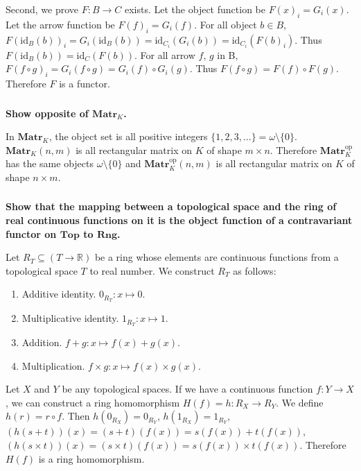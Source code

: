 \documentclass{article}
\begin{document}
Second, we prove $F : B \rightarrow C$ exists. Let the object function be $F(x)_i = G_i(x)$. Let the arrow function be $F(f)_i = G_i(f)$. For all object $b \in B$, $F(\mathrm{id}_B(b))_i = G_i(\mathrm{id}_B(b)) =  \mathrm{id}_{C_i}(G_i(b)) = \mathrm{id}_{C_i}(F(b)_i)$. Thus $F(\mathrm{id}_B(b)) = \mathrm{id}_{C}(F(b))$. For all arrow $f$, $g$ in B, $F(f \circ g)_i = G_i(f \circ g) = G_i(f) \circ G_i(g)$. Thus $F(f \circ g) = F(f) \circ F(g)$. Therefore $F$ is a functor.

\subsubsection{}

\textbf{Show opposite of $\mathbf{Matr}_K$.}

In $\mathbf{Matr}_K$, the object set is all positive integers $\{1, 2, 3, ...\} = \omega \setminus \{0\}$. $\mathbf{Matr}_K(n, m)$ is all rectangular matrix on $K$ of shape $m \times n$. Therefore $\mathbf{Matr}_K^{\mathrm{op}}$ has the same objects $\omega \setminus \{0\}$ and  $\mathbf{Matr}_K^{\mathrm{op}}(n, m)$ is all rectangular matrix on $K$ of shape $n \times m$.

\subsubsection{}

\textbf{Show that the mapping between a topological space and the ring of real continuous functions on it is the object function of a contravariant functor on $\mathbf{Top}$ to $\mathbf{Rng}$.}

Let $R_T \subseteq (T \rightarrow \mathbb{R})$ be a ring whose elements are continuous functions from a topological space $T$ to real number. We construct $R_T$ as follows:

\begin{enumerate}
    \item Additive identity. $0_{R_T} : x \mapsto 0$.
    \item Multiplicative identity. $1_{R_T} : x \mapsto 1$.
    \item Addition. $f + g : x \mapsto f(x) + g(x)$.
    \item Multiplication. $f \times g : x \mapsto f(x) \times g(x)$.
\end{enumerate}

Let $X$ and $Y$ be any topological spaces. If we have a continuous function $f : Y \rightarrow X$, we can construct a ring homomorphism $H(f) = h : R_X \rightarrow R_Y$. We define $h(r) = r \circ f$. Then $h(0_{R_X}) = 0_{R_Y}$, $h(1_{R_X}) = 1_{R_Y}$, $(h(s + t))(x) = (s + t)(f(x)) = s(f(x)) + t(f(x))$, $(h(s \times t))(x) = (s \times t)(f(x)) = s(f(x)) \times t(f(x))$. Therefore $H(f)$ is a ring homomorphism.
\end{document}
